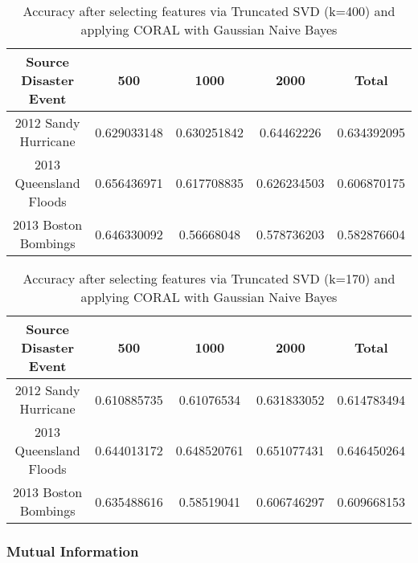 \begin{table}[!h]%
    \begin{center}
    \caption{Accuracy after selecting features via Truncated SVD (k=400) and applying CORAL with Gaussian Naive Bayes}
    \begin{tabular}[c]{|c|c|c|c|c|}
        \hline
        Source Disaster Event & 500 & 1000 & 2000 & Total \\
        \hline
        2012 Sandy Hurricane & 0.629033148 & 0.630251842 & 0.64462226 & 0.634392095 \\
        2013 Queensland Floods & 0.656436971 & 0.617708835 & 0.626234503 & 0.606870175 \\
        2013 Boston Bombings & 0.646330092 & 0.56668048 & 0.578736203 & 0.582876604 \\
        \hline
    \end{tabular}
    \label{tabletrunsvd400}
   \end{center}
\end{table}

\begin{table}[!h]%
    \begin{center}
    \caption{Accuracy after selecting features via Truncated SVD (k=170) and applying CORAL with Gaussian Naive Bayes}
    \begin{tabular}[c]{|c|c|c|c|c|}
        \hline
        Source Disaster Event & 500 & 1000 & 2000 & Total \\
        \hline
        2012 Sandy Hurricane & 0.610885735 & 0.61076534 & 0.631833052 & 0.614783494 \\
        2013 Queensland Floods & 0.644013172 & 0.648520761 & 0.651077431 & 0.646450264 \\
        2013 Boston Bombings & 0.635488616 & 0.58519041 & 0.606746297 & 0.609668153 \\
        \hline
    \end{tabular}
    \label{tabletrunsvd170}
   \end{center}
\end{table}


\subsubsection{Mutual Information}

